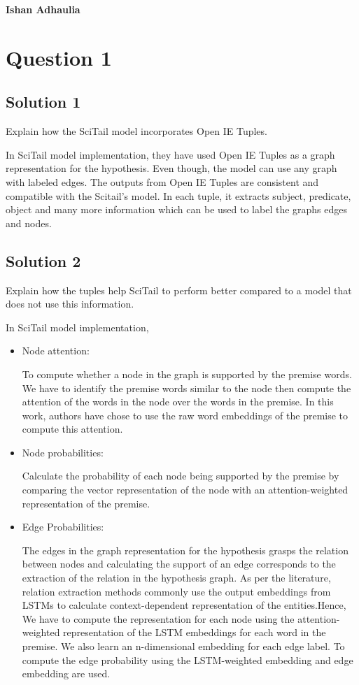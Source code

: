 \documentclass[12pt,leqno,a4paper]{article}
\begin{document}
\textbf{Ishan Adhaulia}

\section{Question 1}

\subsection{Solution 1}
Explain how the SciTail model incorporates Open IE Tuples.
\newline

In SciTail model implementation, they have used Open IE Tuples as a graph representation for the hypothesis. Even though, the model can use any graph with labeled edges. The outputs from Open IE Tuples are consistent and compatible with the Scitail's model. In each tuple, it extracts subject, predicate, object and many more information which can be used to label the graphs edges and nodes.

\subsection{Solution 2}
Explain how the tuples help SciTail to perform better compared to a model
that does not use this information. 
\newline

In SciTail model implementation,
\begin{itemize}
    \item Node attention: 
    
    To compute whether a node in the graph is supported by the premise words. We have to identify the premise words similar to the node then compute the attention of the words in the node over the words in the premise. In this work, authors have chose to use the raw word embeddings of the premise to compute this attention.
    
    \item Node probabilities:
    
    Calculate the probability of each node being supported by the premise by comparing the vector representation of the node with an attention-weighted representation of the premise. 
    
    \item Edge Probabilities:
    
    The edges in the graph representation for the hypothesis grasps the relation between nodes and calculating the support of an edge corresponds to the extraction of the relation in the hypothesis graph.
    As per the literature, relation extraction methods  commonly use the output embeddings from LSTMs to calculate context-dependent representation of the entities.Hence, We have to compute the representation for each node using the attention-weighted representation of the LSTM embeddings for each word in the premise.
    We also learn an n-dimensional embedding for each edge label. To compute
    the edge probability using the LSTM-weighted embedding and edge embedding are used.
\end{itemize}
\end{document}
